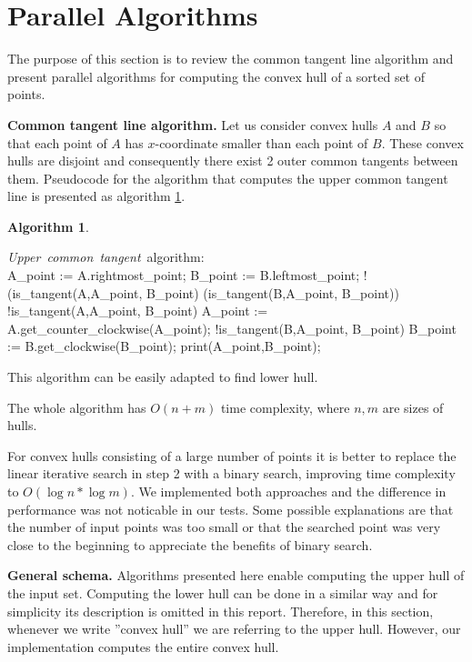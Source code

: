 \documentclass[letterpaper]{article}
\newcommand{\mypar}[1]{{\bf #1.}}
\theoremstyle{definition}
\newtheorem{algorithm}{Algorithm}
\begin{document}
\section{Parallel Algorithms}

The purpose of this section is to review the common tangent line algorithm and present parallel algorithms for computing the convex hull of a sorted set of points.

\mypar{Common tangent line algorithm}
Let us consider convex hulls $A$ and $B$ so that each point of $A$ has $x$-coordinate smaller than each point of $B$. 
These convex hulls are disjoint and consequently there exist 2 outer common tangents between them. 
Pseudocode for the algorithm that computes the upper common tangent line is presented as algorithm \ref{alg:common-tangent}.

\begin{algorithm}
\label{alg:common-tangent}
\begin{program}
\mbox{{\it Upper common tangent} algorithm:}
\BEGIN \\ %
  A\_point := A.rightmost\_point;
  B\_point := B.leftmost\_point;
\WHILE !(is\_tangent(A,A\_point, B\_point) \AND 
 (is\_tangent(B,A\_point, B\_point)) \DO
	  \WHILE !is\_tangent(A,A\_point, B\_point) \DO
		A\_point :=
		\;\;\;\;A.get\_counter\_clockwise(A\_point);
	  \OD 
	  \WHILE !is\_tangent(B,A\_point, B\_point) \DO
		B\_point := B.get\_clockwise(B\_point);
	  \OD  
 \OD
 print(A\_point,B\_point);
\END
\end{program}
\end{algorithm}

This algorithm can be easily adapted to find lower hull.

The whole algorithm has $O(n+m)$ time complexity, where $n,m$ are sizes of hulls.

For convex hulls consisting of a large number of points it is better to replace the linear iterative search in step 2 with a binary search, improving time complexity to $O(\log n*\log m)$.
We implemented both approaches and the difference in performance was not noticable in our tests.
Some possible explanations are that the number of input points was too small or that the searched point was very close to the beginning to appreciate the benefits of binary search.

\mypar{General schema}
Algorithms presented here enable computing the upper hull of the input set. 
Computing the lower hull can be done in a similar way and for simplicity its description is omitted in this report. 
Therefore, in this section, whenever we write ''convex hull'' we are referring to the upper hull.
However, our implementation computes the entire convex hull.
\end{document}
